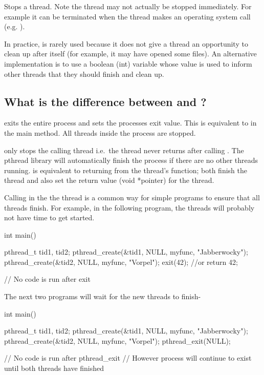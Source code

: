 Stops a thread. Note the thread may not actually be stopped immediately. For example it can be terminated when the thread makes an operating system call (e.g. ).

In practice,  is rarely used because it does not give a thread an opportunity to clean up after itself (for example, it may have opened some files). An alternative implementation is to use a boolean (int) variable whose value is used to inform other threads that they should finish and clean up.

\subsection{\texorpdfstring{What is the difference between  and ?}{What is the difference between exit and pthread\_exit?}}\label{what-is-the-difference-between-exit-and-pthreadux5fexit}

 exits the entire process and sets the processes exit value. This is equivalent to  in the main method. All threads inside the process are stopped.

 only stops the calling thread i.e.~the thread never returns after calling . The pthread library will automatically finish the process if there are no other threads running.  is equivalent to returning from the thread's function; both finish the thread and also set the return value (void *pointer) for the thread.

Calling  in the the  thread is a common way for simple programs to ensure that all threads finish. For example, in the following program, the  threads will probably not have time to get started.

\begin{code}[language=C]
int main() {
  pthread_t tid1, tid2;
  pthread_create(&tid1, NULL, myfunc, "Jabberwocky");
  pthread_create(&tid2, NULL, myfunc, "Vorpel");
  exit(42); //or return 42;

  // No code is run after exit
}
\end{code}

The next two programs will wait for the new threads to finish-

\begin{code}[language=C]
int main() {
  pthread_t tid1, tid2;
  pthread_create(&tid1, NULL, myfunc, "Jabberwocky");
  pthread_create(&tid2, NULL, myfunc, "Vorpel");
  pthread_exit(NULL); 

  // No code is run after pthread_exit
  // However process will continue to exist until both threads have finished
}
\end{code}

